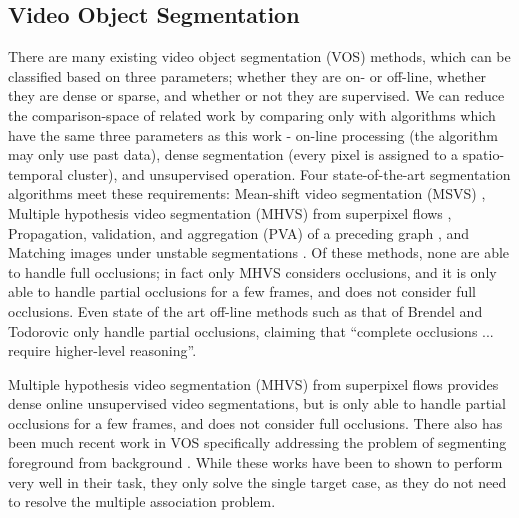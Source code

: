 \subsection{Video Object Segmentation}
There are many existing video object segmentation (VOS) methods, which can be classified based on three parameters; whether they are on- or off-line, whether they are dense or sparse, and whether or not they are supervised. We can reduce the comparison-space of related work by comparing only with algorithms which have the same three parameters as this work - on-line processing (the algorithm may only use past data), dense segmentation (every pixel is assigned to a spatio-temporal cluster), and unsupervised operation. Four state-of-the-art segmentation algorithms meet these requirements: Mean-shift video segmentation (MSVS) \cite{MSVS}, Multiple hypothesis video segmentation (MHVS) from superpixel flows \cite{MHVS}, Propagation, validation, and aggregation (PVA) of a preceding graph \cite{PropValAgg}, and Matching images under unstable segmentations \cite{MatchingUnstable}.  Of these methods, none are able to handle full occlusions; in fact only MHVS considers occlusions, and it is only able to handle partial 
occlusions for a few frames, and does not consider full occlusions. Even state of the art off-line methods such as that of Brendel and Todorovic \cite{SegTrackRegions} only handle partial occlusions, claiming that ``complete occlusions ... require higher-level reasoning''.  

Multiple hypothesis video segmentation (MHVS) from superpixel flows \cite{MHVS} provides dense online unsupervised video segmentations, but is only able to handle partial occlusions for a few frames, and does not consider full occlusions. There also has been much recent work in VOS specifically addressing the problem of segmenting foreground from background \cite{MWCwMC,GC_SURF}. While these works have been to shown to perform very well in their task, they only solve the single target case, as they do not need to resolve the multiple association problem.

